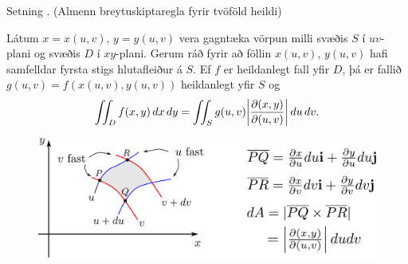 \begin{frame}{} 

\begin {block}{Setning \kaflanr. (Almenn breytuskiptaregla fyrir tvöföld heildi)}

Látum $x=x(u,v)$, $y=y(u,v)$ vera gagntæka vörpun milli svæðis $S$ í
$uv$-plani og svæðis $D$ í $xy$-plani.  Gerum ráð fyrir að föllin  
$x(u,v)$, $y(u,v)$ hafi samfelldar fyrsta stigs hlutafleiður á $S$.  Ef
$f$ er heildanlegt fall yfir $D$, þá er fallið $g(u,v)=f(x(u,v), y(u,v))$
heildanlegt yfir $S$ og 
$$\int\!\!\!\int_D f(x,y)\,dx\,dy=\int\!\!\!\int_S g(u,v)
\bigg|\frac{\partial(x,y)}{\partial(u,v)}\bigg|\,du\,dv.$$
\end{block}
\begin {figure}[h!]
 \centering
            \includegraphics[width=0.85\linewidth]{changevar}
\end {figure}
\end{frame}



